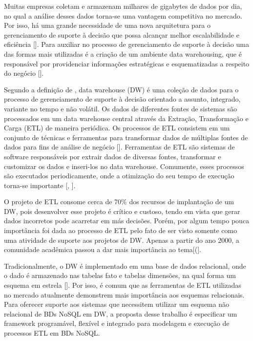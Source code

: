 Muitas empresas coletam e armazenam milhares de gigabytes de dados por dia, no qual a análise desses dados torna-se uma vantagem competitiva no mercado. Por isso, há uma grande necessidade de uma nova arquitetura para o gerenciamento de suporte à decisão que possa alcançar melhor escalabilidade e eficiência [\cite{liu:2013}]. Para auxiliar no processo de gerenciamento de suporte à decisão uma das formas mais utilizadas é a criação de um ambiente data warehousing, que é responsável por providenciar informações estratégicas e esquematizadas a respeito do negócio [\cite{dayal:1997}].

Segundo a definição de \cite{kimball:2002}, data warehouse (DW) é uma coleção de dados para o processo de gerenciamento de suporte à decisão orientado a assunto, integrado, variante no tempo e não volátil. Os dados de diferentes fontes de sistemas são processados em um data warehouse central através da Extração, Transformação e Carga (ETL) de maneira periódica. Os processos de ETL consistem em um conjunto de técnicas e ferramentas para transformar dados de múltiplas fontes de dados para fins de análise de negócio [\cite{silva:2016}]. Ferramentas de ETL são sistemas de software responsáveis por extrair dados de diversas fontes, transformar e customizar os dados e inseri-los no data warehouse. Comumente, esses processos são executados periodicamente, onde a otimização do seu tempo de execução torna-se importante [\cite{vassiliadis:2005}, \cite{silva:2016}].

O projeto de ETL consome cerca de 70\% dos recursos de implantação de um DW, pois desenvolver esse projeto é crítico e custoso, tendo em vista que gerar dados incorretos pode acarretar em más decisões. Porém, por algum tempo pouca importância foi dada ao processo de ETL pelo fato de ser visto somente como uma atividade de suporte aos projetos de DW. Apenas a partir do ano 2000, a comunidade acadêmica passou a dar mais importância ao tema[(\cite{silva:2012}].

Tradicionalmente, o DW é implementado em uma base de dados relacional, onde o dado é armazenado nas tabelas fato e tabelas dimensões, na qual forma um esquema em estrela [\cite{kimball:2002}]. Por isso, é comum que as ferramentas de ETL utilizadas no mercado atualmente demonstrem mais importância aos esquemas relacionais. Para oferecer suporte aos sistemas que necessitem utilizar um esquema não relacional de BDs NoSQL em DW, a proposta desse trabalho é especificar um framework programável, flexível e integrado para modelagem e execução de processos ETL em BDs NoSQL.

